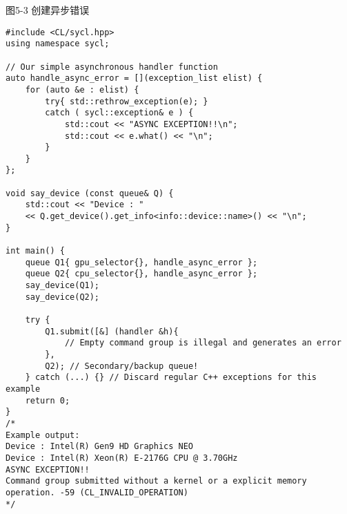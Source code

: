 \hspace*{\fill} \par %
图5-3 创建异步错误
\begin{lstlisting}[caption={}]
#include <CL/sycl.hpp>
using namespace sycl;

// Our simple asynchronous handler function
auto handle_async_error = [](exception_list elist) {
	for (auto &e : elist) {
		try{ std::rethrow_exception(e); }
		catch ( sycl::exception& e ) {
			std::cout << "ASYNC EXCEPTION!!\n";
			std::cout << e.what() << "\n";
		}
	}
};

void say_device (const queue& Q) {
	std::cout << "Device : "
	<< Q.get_device().get_info<info::device::name>() << "\n";
}

int main() { 
	queue Q1{ gpu_selector{}, handle_async_error };
	queue Q2{ cpu_selector{}, handle_async_error };
	say_device(Q1);
	say_device(Q2);
	
	try {
		Q1.submit([&] (handler &h){
			// Empty command group is illegal and generates an error
		},
		Q2); // Secondary/backup queue!
	} catch (...) {} // Discard regular C++ exceptions for this example
	return 0;
}
/*
Example output:
Device : Intel(R) Gen9 HD Graphics NEO
Device : Intel(R) Xeon(R) E-2176G CPU @ 3.70GHz
ASYNC EXCEPTION!!
Command group submitted without a kernel or a explicit memory operation. -59 (CL_INVALID_OPERATION)
*/
\end{lstlisting}






